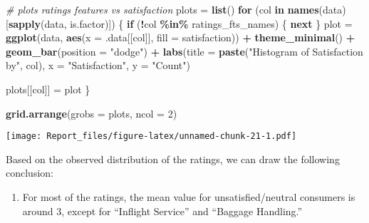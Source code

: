 \documentclass[
]{article}
\newenvironment{Shaded}{\begin{snugshade}}{\end{snugshade}}
\newcommand{\AttributeTok}[1]{\textcolor[rgb]{0.13,0.29,0.53}{#1}}
\newcommand{\CommentTok}[1]{\textcolor[rgb]{0.56,0.35,0.01}{\textit{#1}}}
\newcommand{\ControlFlowTok}[1]{\textcolor[rgb]{0.13,0.29,0.53}{\textbf{#1}}}
\newcommand{\DecValTok}[1]{\textcolor[rgb]{0.00,0.00,0.81}{#1}}
\newcommand{\FunctionTok}[1]{\textcolor[rgb]{0.13,0.29,0.53}{\textbf{#1}}}
\newcommand{\NormalTok}[1]{#1}
\newcommand{\OtherTok}[1]{\textcolor[rgb]{0.56,0.35,0.01}{#1}}
\newcommand{\SpecialCharTok}[1]{\textcolor[rgb]{0.81,0.36,0.00}{\textbf{#1}}}
\newcommand{\StringTok}[1]{\textcolor[rgb]{0.31,0.60,0.02}{#1}}
\providecommand{\tightlist}{%
  \setlength{\itemsep}{0pt}\setlength{\parskip}{0pt}}
\begin{document}
\begin{Shaded}
\begin{Highlighting}[]
\CommentTok{\# plots ratings features vs satisfaction}
\NormalTok{plots }\OtherTok{=} \FunctionTok{list}\NormalTok{()}
\ControlFlowTok{for}\NormalTok{ (col }\ControlFlowTok{in} \FunctionTok{names}\NormalTok{(data)[}\FunctionTok{sapply}\NormalTok{(data, is.factor)]) \{}
  \ControlFlowTok{if}\NormalTok{ (}\SpecialCharTok{!}\NormalTok{col }\SpecialCharTok{\%in\%}\NormalTok{ ratings\_fts\_names) \{}
    \ControlFlowTok{next}
\NormalTok{  \}}
\NormalTok{  plot }\OtherTok{=} \FunctionTok{ggplot}\NormalTok{(data, }\FunctionTok{aes}\NormalTok{(}\AttributeTok{x =}\NormalTok{ .data[[col]], }\AttributeTok{fill =}\NormalTok{ satisfaction)) }\SpecialCharTok{+}
  \FunctionTok{theme\_minimal}\NormalTok{() }\SpecialCharTok{+}
  \FunctionTok{geom\_bar}\NormalTok{(}\AttributeTok{position =} \StringTok{"dodge"}\NormalTok{) }\SpecialCharTok{+}
  \FunctionTok{labs}\NormalTok{(}\AttributeTok{title =} \FunctionTok{paste}\NormalTok{(}\StringTok{"Histogram of Satisfaction by"}\NormalTok{, col), }\AttributeTok{x =} \StringTok{"Satisfaction"}\NormalTok{, }\AttributeTok{y =} \StringTok{"Count"}\NormalTok{)}

\NormalTok{  plots[[col]] }\OtherTok{=}\NormalTok{ plot  }
\NormalTok{\}}

\FunctionTok{grid.arrange}\NormalTok{(}\AttributeTok{grobs =}\NormalTok{ plots, }\AttributeTok{ncol =} \DecValTok{2}\NormalTok{)}
\end{Highlighting}
\end{Shaded}

\texttt{[image: Report\_files/figure-latex/unnamed-chunk-21-1.pdf]}

Based on the observed distribution of the ratings, we can draw the
following conclusion:

\begin{enumerate}
\def\labelenumi{\arabic{enumi}.}
\tightlist
\item
  For most of the ratings, the mean value for unsatisfied/neutral
  consumers is around 3, except for ``Inflight Service'' and ``Baggage
  Handling.''
\end{enumerate}

\begin{Shaded}
\end{Shaded}
\end{document}

